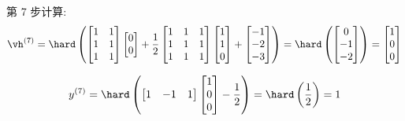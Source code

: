 \documentclass[openany]{ctexbook}
\theoremstyle{kaiti}
\theoremstyle{normal}
\begin{document}
第 7 步计算:
\begin{equation}
  \vh^{(7)}
  =\hard\left(
    \begin{bmatrix}
      1 & 1 \\
      1 & 1 \\
      1 & 1 \\
    \end{bmatrix}
    \begin{bmatrix}
      0 \\ 0 \\
    \end{bmatrix}
    +\frac{1}{2}
    \begin{bmatrix}
      1 & 1 & 1 \\
      1 & 1 & 1 \\
      1 & 1 & 1 \\
    \end{bmatrix}
    \begin{bmatrix}
      1 \\ 1 \\ 0 \\
    \end{bmatrix}
    +
    \begin{bmatrix}
      -1 \\ -2 \\ -3 \\
    \end{bmatrix}
  \right)
  =\hard\left(
    \begin{bmatrix}
      0 \\ -1 \\ -2 \\
    \end{bmatrix}
  \right)
  =
  \begin{bmatrix}
    1 \\ 0 \\ 0 \\
  \end{bmatrix}
\end{equation}

\begin{equation}
  y^{(7)}
  =\hard\left(
    \begin{bmatrix}
      1 & -1 & 1 \\
    \end{bmatrix}
    \begin{bmatrix}
      1 \\ 0 \\ 0 \\
    \end{bmatrix}
    -\frac{1}{2}
  \right)
  =\hard\left(
    \frac{1}{2}
  \right)
  =1
\end{equation}
\end{document}
